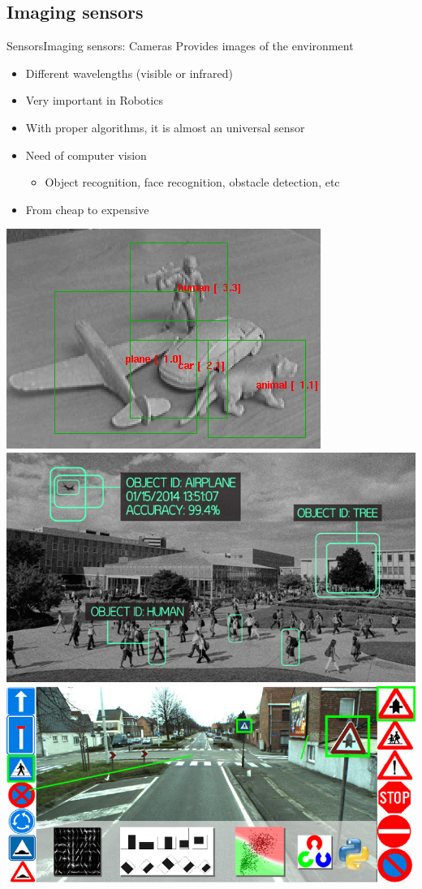 \documentclass[10pt,compress]{beamer} %
\begin{document}
\subsection{Imaging sensors}
\begin{frame}{Sensors}{Imaging sensors: Cameras}
	Provides images of the environment
	\begin{itemize}
		\item Different wavelengths (visible or infrared)
		\item Very important in Robotics
		\item With proper algorithms, it is almost an universal sensor
		\item Need of \alert{computer vision}
			\begin{itemize}
			\item Object recognition, face recognition, obstacle detection, etc
			\end{itemize}
		\item From cheap to expensive
	\end{itemize}

	\begin{center}
	\includegraphics[width=0.3\linewidth]{figs/computervision.png}\enspace
	\includegraphics[width=0.33\linewidth]{figs/computervision2.jpg}\enspace
	\includegraphics[width=0.33\linewidth]{figs/computervision3.png}
	\end{center}
\end{frame}
\end{document}
